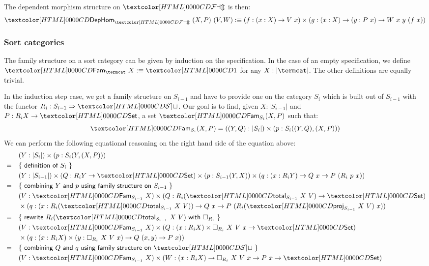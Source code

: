The dependent morphism structure on $\FAM$ is then:
$$
\DepHom_{\FAM}\ (X , P)\ (V , W) \ddefeq (f : (x : X) \to V\ x) \times (g : (x : X) \to (y : P\ x) \to W\ x\ y\ (f\ x))
$$
%
%
\subsubsection{Sort categories}

The family structure on a sort category can be given by induction on
the specification. In the case of an empty specification, we define
$\Fam_{\termcat}\ X \ddefeq \unitty$ for any $X : | \termcat |$. The
other definitions are equally trivial.

In the induction step case, we get a family structure on $S_{i-1}$ and
have to provide one on the category $S_i$ which is built out of
$S_{i-1}$ with the functor $R_i : \Func{S_{i-1}}{\SET}$. Our goal is
to find, given $X : | S_{i-1} |$ and $P : R_i X \to \Set$, a set
$\Fam_{S_i} (X, P)$ such that:
$$
\Fam_{S_i} (X, P) = ((Y , Q) : | S_i |) \times (p : S_i((Y,Q),(X,P)))
$$
We can perform the following equational reasoning on the right hand
side of the equation above:
\begin{align*}
  &&&(Y : | S_i |) \times (p : S_i(Y,(X,P))) \\
  &=& &\reasontext{definition of $S_i$} \\
  &&&(Y : | S_{i-1} |) \times (Q : R_i Y \to \Set) \times (p : S_{i-1}(Y,X)) \times (q : (x : R_i Y) \to Q\ x \to P\ (R_i\ p\ x)) \\
  &=& &\reasontext{combining $Y$ and $p$ using family structure on $S_{i-1}$} \\
  &&&(V : \Fam_{S_{i-1}}\ X) \times (Q : R_i (\total_{S_{i-1}}\ X\ V) \to \Set) \\
  &&&\times (q : (x : R_i (\total_{S_{i-1}}\ X\ V)) \to Q\ x \to P\ (R_i (\proj_{S_{i-1}}\ X\ V)\ x)) \\
  &=& &\reasontext{rewrite $R_i (\total_{S_{i-1}}\ X\ V)$ with $\Box_{R_i}$} \\
  &&&(V : \Fam_{S_{i-1}}\ X) \times (Q : (x : R_i X) \times \Box_{R_i}\ X\ V\ x \to \Set) \\
  &&&\times (q : (x : R_i X) \times (y : \Box_{R_i}\ X\ V\ x) \to Q\ (x , y) \to P\ x)) \\
  &=& &\reasontext{combining $Q$ and $q$ using family structure on $\SET$} \\
  &&&(V : \Fam_{S_{i-1}} X) \times (W : (x : R_i X) \to \Box_{R_i}\ X\ V\ x \to P\ x \to \Set)
\end{align*}

